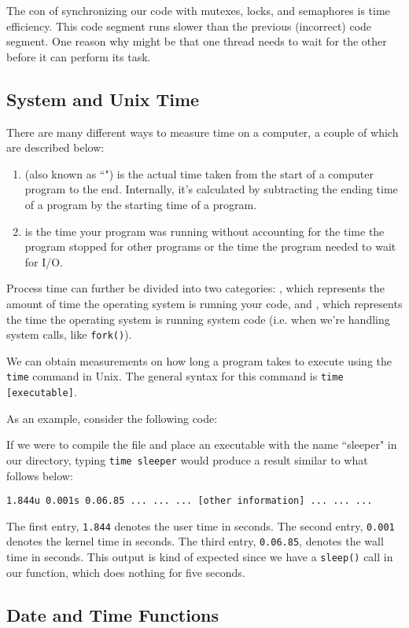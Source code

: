 The con of synchronizing our code with mutexes, locks, and semaphores is time efficiency. This code segment runs slower than the previous (incorrect) code segment. One reason why might be that one thread needs to wait for the other before it can perform its task.  


\subsection{System and Unix Time}


There are many different ways to measure time on a computer, a couple of which are described below: \begin{enumerate}
    \item {} (also known as ``") is the actual time taken from the start of a computer program to the end. Internally, it's calculated by subtracting the ending time of a program by the starting time of a program.
    \item {} is the time your program was running without accounting for the time the program stopped for other programs or the time the program needed to wait for I/O.
\end{enumerate}

Process time can further be divided into two categories: , which represents the amount of time the operating system is running your code, and , which represents the time the operating system is running system code (i.e. when we're handling system calls, like \verb!fork()!).

We can obtain measurements on how long a program takes to execute using the \verb!time! command in Unix. The general syntax for this command is \verb!time [executable]!. 

As an example, consider the following code:

\lstset{caption=Time Example}
\begin{center}

\end{center}

If we were to compile the file and place an executable with the name ``sleeper" in our directory, typing \verb!time sleeper! would produce a result similar to what follows below: \begin{center}
\verb!1.844u 0.001s 0.06.85 ... ... ... [other information] ... ... ...! 
\end{center}

The first entry, \verb!1.844! denotes the user time in seconds. The second entry, \verb!0.001! denotes the kernel time in seconds. The third entry, \verb!0.06.85!, denotes the wall time in seconds. This output is kind of expected since we have a \verb!sleep()! call in our function, which does nothing for five seconds. 


\subsection{Date and Time Functions}

